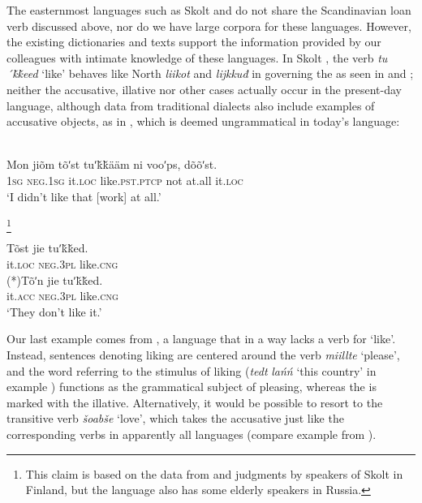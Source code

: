 \documentclass[output=paper]{LSP/langsci}
\begin{document}
 The easternmost  languages such as Skolt  and  do not share the Scandinavian loan verb discussed above, nor do we have large corpora for these languages. However, the existing dictionaries and texts support the information provided by our colleagues with intimate knowledge of these languages. In Skolt , the verb \textit{tu´ǩǩeed} ‘like’ behaves like North  \textit{liikot} and   \textit{lijkkuđ} in governing the  as seen in  and ; neither the accusative, illative nor other cases actually occur in the present-day language, although data from traditional dialects also include examples of accusative objects, as in , which is deemed ungrammatical in today’s language:

\begin{exe}
\ex%
\label{16-ki-ex:16}
\\
\gll Mon jiõm tõʹst tuʹǩǩääm ni vooʹps, dõõʹst.\\
\textsc{1sg} \textsc{neg}.\textsc{1sg} it.\textsc{loc} like.\textsc{pst}.\textsc{ptcp} not at.all it.\textsc{loc}\\
\glt ‘I didn’t like that [work] at all.’
\end{exe}

\begin{exe}
\ex%
\label{16-ki-ex:17}
\footnote{This claim is based on the data from and judgments by speakers of Skolt  in Finland, but the language also has some elderly speakers in Russia.}
\begin{xlist}

\ex\label{16-ki-ex:17a}
\gll Tõst jie tuʹǩǩed.\\
 it.\textsc{loc} \textsc{neg}.\textsc{3pl} like.\textsc{cng}\\ 

\ex\label{16-ki-ex:17b}
\gll (*)Tõʹn jie tuʹǩǩed.\\
 it.\textsc{acc} \textsc{neg}.\textsc{3pl} like.\textsc{cng}\\
\glt  ‘They don’t like it.’ 
\end{xlist}
\end{exe}
 

Our last example comes from , a language that in a way lacks a verb for ‘like’. Instead, sentences denoting liking are centered around the verb \textit{miillte} ‘please’, and the word referring to the stimulus of liking (\textit{tedt} \textit{lańń} ‘this country’ in example ) functions as the grammatical subject of pleasing, whereas the  is marked with the illative. Alternatively, it would be possible to resort to the transitive verb \textit{šoabše} ‘love’, which takes the accusative just like the corresponding verbs in apparently all  languages (compare example  from  ).
\end{document}
